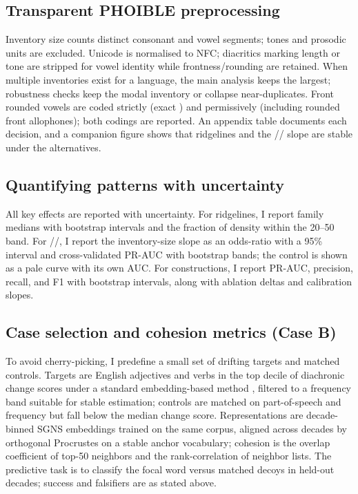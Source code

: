 \documentclass[12pt]{article}
\begin{document}
\subsection*{Transparent PHOIBLE preprocessing}

Inventory size counts distinct consonant and vowel segments; tones and prosodic units are excluded. Unicode is normalised to NFC; diacritics marking length or tone are stripped for vowel identity while frontness/rounding are retained. When multiple inventories exist for a language, the main analysis keeps the largest; robustness checks keep the modal inventory or collapse near-duplicates. Front rounded vowels are coded strictly (exact ) and permissively (including rounded front allophones); both codings are reported. An appendix table documents each decision, and a companion figure shows that ridgelines and the // slope are stable under the alternatives.

\subsection*{Quantifying patterns with uncertainty}

All key effects are reported with uncertainty. For ridgelines, I report family medians with bootstrap intervals and the fraction of density within the 20–50 band. For //, I report the inventory-size slope as an odds-ratio with a 95\% interval and cross-validated PR-AUC with bootstrap bands; the  control is shown as a pale curve with its own AUC. For constructions, I report PR-AUC, precision, recall, and F1 with bootstrap intervals, along with ablation deltas and calibration slopes.

\subsection*{Case selection and cohesion metrics (Case B)}

To avoid cherry-picking, I predefine a small set of drifting targets and matched controls. Targets are English adjectives and verbs in the top decile of diachronic change scores under a standard embedding-based method \citep{HamiltonEtAl2016}, filtered to a frequency band suitable for stable estimation; controls are matched on part-of-speech and frequency but fall below the median change score. Representations are decade-binned SGNS embeddings trained on the same corpus, aligned across decades by orthogonal Procrustes on a stable anchor vocabulary; cohesion is the overlap coefficient of top-50 neighbors and the rank-correlation of neighbor lists. The predictive task is to classify the focal word versus matched decoys in held-out decades; success and falsifiers are as stated above.
\end{document}
